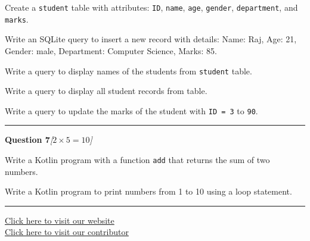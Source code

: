 \documentclass[11pt,a4paper]{article}
\newcommand{\pts}[1]{\hfill   \textit{[#1]}}
\begin{document}
\begin{parts}
  \item Create a   \texttt{student} table with attributes:   \texttt{ID},   \texttt{name},   \texttt{age},   \texttt{gender},   \texttt{department}, and   \texttt{marks}.
  \item Write an SQLite query to insert a new record with details: Name: Raj, Age: 21, Gender: male, Department: Computer Science, Marks: 85.
  \item Write a query to display names of the students from   \texttt{student} table.
  \item Write a query to display all student records from table.
  \item Write a query to update the marks of the student with   \texttt{ID = 3} to   \texttt{90}.
\end{parts}

\medskip\rule{\linewidth}{0.2pt}\medskip




\noindent   \textbf{Question 7}\pts{$2  \times 5 = 10$}

\begin{parts}
  \item Write a Kotlin program with a function   \texttt{add} that returns the sum of two numbers.
  \item Write a Kotlin program to print numbers from 1 to 10 using a loop statement.
\end{parts}

\vfill\rule{\linewidth}{0.4pt}

\begin{center}\small
\href{https://bhu-exam.vercel.app/}{Click here to visit our website}\\[4pt]
\href{https://me-aryan.vercel.app/}{Click here to visit our contributor}
\end{center}
\end{document}
